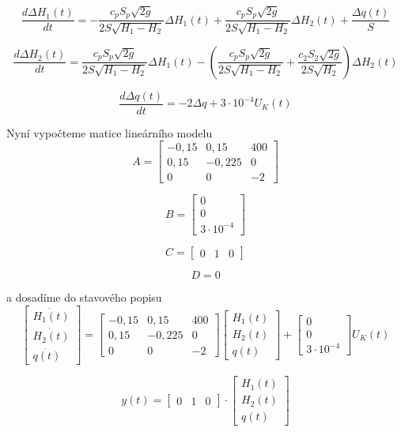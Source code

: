 \documentclass{article}
\begin{document}
			\[\frac{d\Delta H_1(t)}{dt}=-\frac{c_pS_p\sqrt{2g}}{2S\sqrt{H_1-H_2}}\Delta H_1(t)+\frac{c_pS_p\sqrt{2g}}{2S\sqrt{H_1-H_2}}\Delta H_2(t)+\frac{\Delta q(t)}{S}\]

			\[\frac{d\Delta H_2(t)}{dt}=\frac{c_pS_p\sqrt{2g}}{2S\sqrt{H_1-H_2}}\Delta H_1(t)-(\frac{c_pS_p\sqrt{2g}}{2S\sqrt{H_1-H_2}}+\frac{c_2S_2\sqrt{2g}}{2S\sqrt{H_2}})\Delta H_2(t)\]

			\[\frac{d\Delta q(t)}{dt}=-2\Delta q+3\cdot10^{-4}U_{K}(t)\]

			Nyní vypočteme matice lineárního modelu
			\[A=\begin{bmatrix}
				-0,15&0,15&400\\
				0,15&-0,225&0\\
				0&0&-2
			\end{bmatrix}\]

			\[B=\begin{bmatrix}
				0\\
				0\\
				3\cdot10^{-4}
			\end{bmatrix}\]

			\[C=\begin{bmatrix}
				0&1&0
			\end{bmatrix}\]

			\[D=0\]

			a dosadíme do stavového popisu
			\[\begin{bmatrix}
				\dot{H_1(t)}\\
				\dot{H_2(t)}\\
				\dot{q(t)}
			\end{bmatrix} =
			\begin{bmatrix}
				-0,15&0,15&400\\
				0,15&-0,225&0\\
				0&0&-2
			\end{bmatrix}
			\begin{bmatrix}
				H_1(t)\\
				H_2(t)\\
				q(t)
			\end{bmatrix}+
			\begin{bmatrix}
				0\\
				0\\
				3\cdot10^{-4}
			\end{bmatrix} U_{K}(t)\]

			\[y(t)=
			\begin{bmatrix}
				0&1&0
			\end{bmatrix}\cdot
			\begin{bmatrix}
				H_1(t)\\
				H_2(t)\\
				q(t)
			\end{bmatrix}\]
\end{document}
